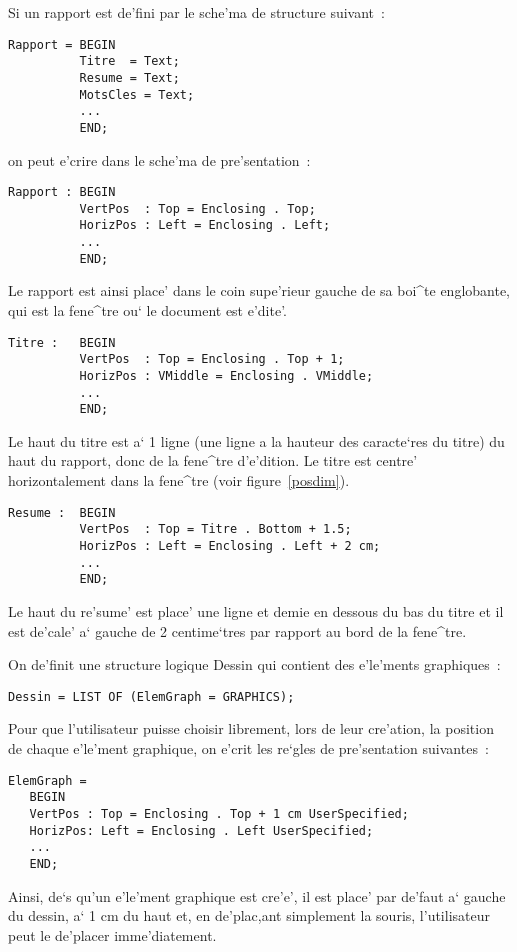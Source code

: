 {\label{expos1}
\begin{example}
Si un rapport est de'fini par le sche'ma de structure suivant~:

\begin{verbatim}
Rapport = BEGIN
          Titre  = Text;
          Resume = Text;
          MotsCles = Text;
          ...
          END;
\end{verbatim}
on peut e'crire dans le sche'ma de pre'sentation~:

\label{exemplerapp}
\begin{verbatim}
Rapport : BEGIN
          VertPos  : Top = Enclosing . Top;
          HorizPos : Left = Enclosing . Left;
          ...
          END;
\end{verbatim}
Le rapport est ainsi place' dans le coin supe'rieur gauche de sa boi^te
englobante, qui est la fene^tre ou` le document est e'dite'.

\begin{verbatim}
Titre :   BEGIN
          VertPos  : Top = Enclosing . Top + 1;
          HorizPos : VMiddle = Enclosing . VMiddle;
          ...
          END;
\end{verbatim}
Le haut du titre est a` 1 ligne (une ligne a la hauteur des caracte`res du
titre) du haut du rapport, donc de la fene^tre d'e'dition. Le titre est centre'
horizontalement dans la fene^tre (voir figure~\ref{posdim}).

\begin{verbatim}
Resume :  BEGIN
          VertPos  : Top = Titre . Bottom + 1.5;
          HorizPos : Left = Enclosing . Left + 2 cm;
          ...
          END;
\end{verbatim}
Le haut du re'sume' est place' une ligne et demie en dessous du bas du titre et
il est de'cale' a` gauche de 2 centime`tres par rapport au bord de la fene^tre.
\end{example}

\label{expos2}
\begin{example}
On de'finit une structure logique Dessin qui contient des e'le'ments
graphiques~:

\begin{verbatim}
Dessin = LIST OF (ElemGraph = GRAPHICS);
\end{verbatim}

Pour que l'utilisateur puisse choisir librement, lors de leur cre'ation, la
position de chaque e'le'ment graphique, on e'crit les re`gles de pre'sentation
suivantes~:
\begin{verbatim}
ElemGraph =
   BEGIN
   VertPos : Top = Enclosing . Top + 1 cm UserSpecified;
   HorizPos: Left = Enclosing . Left UserSpecified;
   ...
   END;
\end{verbatim}
Ainsi, de`s qu'un e'le'ment graphique est cre'e', il est place' par de'faut
a` gauche du dessin, a` 1 cm du haut et, en de'plac,ant simplement la souris,
l'utilisateur peut le de'placer imme'diatement.


\end{example}}
